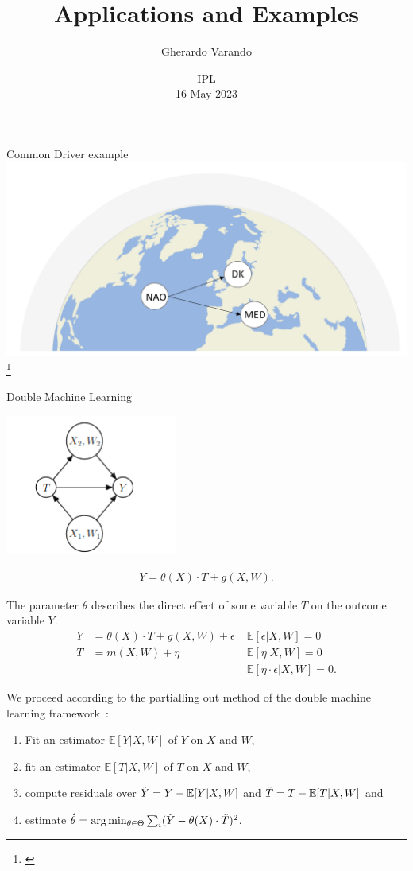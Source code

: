 \documentclass{beamer}
\institute[]{}
\title{Applications and Examples}
\author{Gherardo Varando}
\date{IPL \\ 16 May 2023}
\newcommand\blfootnote[1]{%
  \begingroup
  \renewcommand\thefootnote{}\footnote{#1}%
  \addtocounter{footnote}{-1}%
  \endgroup
}
\newcommand{\E}{\mathbb{E}}
\begin{document}

\begin{frame}
	\titlepage
\end{frame}

\begin{frame}{Common Driver example}
	\includegraphics[scale=0.5]{images/ex1}
	\blfootnote{\citet{QuantifyingCausalPathwaysofTeleconnections}}
\end{frame}
\begin{frame}{Double Machine Learning}


	\includegraphics[scale=0.5]{images/dmlgraph}


\begin{align}
    Y = \theta(X)\cdot T + g(X, W).
\end{align}

The parameter $\theta$ describes the direct effect of some variable $T$ on the outcome variable $Y$. 
\begin{align}
Y &= \theta(X)\cdot T + g(X,W)+\epsilon \; &\E[\epsilon|X, W]=0\\
T &= m(X,W) + \eta & \E[\eta|X, W]=0\\
 & & \E[\eta\cdot \epsilon |X,W]=0.
\end{align}
\end{frame}
\begin{frame}
We proceed according to the partialling out method of the double machine learning framework~\cite{Chernozhukov2018}:
\begin{enumerate}
    \item Fit an estimator $\E[Y|X,W]$ of $Y$ on $X$ and $W$,
    \item fit an estimator $\E[T|X,W]$ of $T$ on $X$ and $W$,
    \item compute residuals over $\Tilde{Y} = Y-\E[Y|X,W]$ and $\Tilde{T} = T-\E[T|X,W]$ and
    \item estimate $\hat{\theta} = \arg \min_{\theta \in \Theta} \sum_i (\Tilde{Y} - \theta(X)\cdot \Tilde{T})^2$.
\end{enumerate}
\end{frame}
\end{document}

